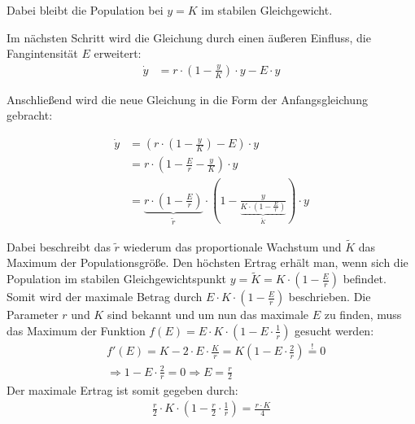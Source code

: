 \documentclass[a4paper,twoside]{article}
\begin{document}
	Dabei bleibt die Population bei \(y = K\) im stabilen Gleichgewicht.

	Im nächsten Schritt wird die Gleichung durch einen äußeren Einfluss, die Fangintensität \(E\) erweitert:
	\begin{align*}
		\dot{y} &= r \cdot\left(1-\frac{y}{K}\right) \cdot y - E \cdot y
	\end{align*}	
	
	Anschließend wird die neue Gleichung in die Form der Anfangsgleichung gebracht:
		
	\begin{align*}
		\dot{y} &= \left( r \cdot\left(1 - \frac{y}{K}\right) - E\right) \cdot y \\
		&= r \cdot \left( 1 - \frac{E}{r} - \frac{y}{K} \right) \cdot y \\
		&= \underbrace{r \cdot \left( 1 - \frac{E}{r} \right)}_{\tilde{r}} \cdot \left( 1 - \frac{y}{\underbrace{K \cdot \left(1 - \frac{E}{r}\right)}_{\tilde{K}}} \right) \cdot y
	\end{align*}
	
	Dabei beschreibt das \(\tilde{r}\) wiederum das proportionale Wachstum und \(\tilde{K}\) das Maximum der Populationsgröße. Den höchsten Ertrag erhält man, wenn sich die Population im stabilen Gleichgewichtspunkt \(y = \tilde{K} = K \cdot \left(1 - \frac{E}{r}\right) \) befindet. Somit wird der maximale Betrag durch \(E \cdot K \cdot \left(1 - \frac{E}{r}\right)\) beschrieben. Die Parameter \(r\) und \(K\) sind bekannt und um nun das maximale \(E\) zu finden, muss das Maximum der Funktion \(f(E) = E \cdot K \cdot \left(1 - E \cdot \frac{1}{r}\right)\) gesucht werden:
	\begin{align*}
		&f'(E) = K - 2 \cdot E \cdot \frac{K}{r} = K \left(1 - E \cdot \frac{2}{r} \right) \stackrel{!}{=} 0 \\
		&\Rightarrow 1 - E \cdot \frac{2}{r} = 0 \Rightarrow E = \frac{r}{2}
	\end{align*}
	Der maximale Ertrag ist somit gegeben durch:
	\begin{align*}
		\frac{r}{2} \cdot K \cdot \left(1 - \frac{r}{2}\cdot\frac{1}{r}\right) = \frac{r \cdot K}{4}
	\end{align*}
	
\end{document}
